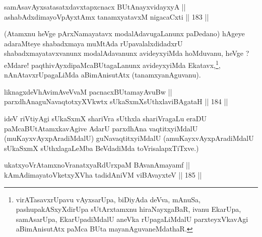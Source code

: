 
\begin{shl}
samAsavAyxsatasatxdavxtapxcnacx BUtAnayxvidayxyA || \\
ashabAdxdimayoV\s pAyxtAmx tanamxyatavxM nigacaCxti \hfill || 183 ||  
\end{shl}

\begin{artha}
(Atamxnu heVge pArxNamayatavx modalAdavugaLanunx paDedano) hAgeye
adaraMteye shabadxmaya muMtAda rUpavalalxdidadxrU
shabadxmayatavxvanunx modalAdavanunx avideyxyiMda hoMduvanu, heVge ?
eMdare! paqthivAyxdipaMcaBUtagaLanunx avideyxyiMda
Ekatavx,\footnote[1 2]{virATasavxrUpavu vAyxsarUpa, biDiyAda deVva,
mAnuSa, pashupakASxyXdirUpa sUtArxtamxnu hiraNayxgaBaR, ivanu
EkarUpa, samAsarUpa, EkarUpadiMdalU aneVka rUpagaLiMdalU
parxteyxVkavAgi aBimAnisutAtx paMca BUta mayanAguvaneMdathaR.}, nAnAtavx\footnotemark rUpagaLiMda aBimAnisutAtx
(tanamxyanAguvanu).
\end{artha}

\begin{shl}
\footnotemark[3]liknagxdeVhAvimAveVvaM pacnacxBUtamayAvuBw || \\
parxdhAnaguNavaqtotxyXVkwtx sUkaSxmXsUthxlaviBAgataH \hfill || 184 ||  
\end{shl}

\begin{artha}
ideV riVtiyAgi sUkaSxmX shariVra sUthxla shariVragaLu eraDU
paMcaBUtAtamxkavAgive AdarU parxdhAna vaqtitxyiMdalU
(muKayxvAyxpAradiMdalU) guNavaqtitxyiMdalU (amuKayxvAyxpAradiMdalU
sUkaSxmX sUthxlagaLeMba BeVdadiMda toVrisalapxTiTxve.)
\end{artha}



\begin{shl}
ukatxyoVrAtamxnoVranatxyaRdUrxpaM BAvanAmayamf || \\
kAmAdimayatoVketxyXVha tadidAniVM viBAvayxteV \hfill || 185 ||  
\end{shl}


